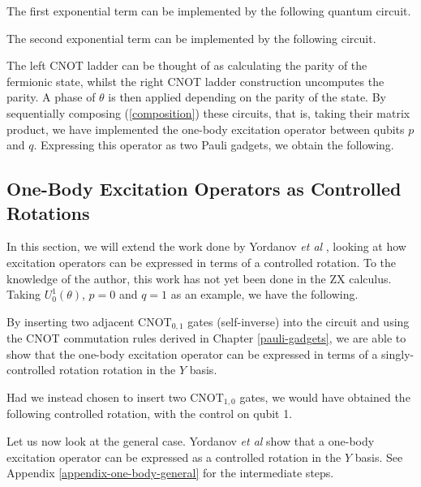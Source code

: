 The first exponential term can be implemented by the following quantum circuit.


The second exponential term can be implemented by the following circuit.


The left CNOT ladder can be thought of as calculating the parity of the fermionic state, whilst the right CNOT ladder construction uncomputes the parity. A phase of $\theta$ is then applied depending on the parity of the state. By sequentially composing (\ref{composition}) these circuits, that is, taking their matrix product, we have implemented the one-body excitation operator between qubits $p$ and $q$. Expressing this operator as two Pauli gadgets, we obtain the following.


\subsection{One-Body Excitation Operators as Controlled Rotations}

In this section, we will extend the work done by Yordanov \textit{et al} \cite{Yordanov2020}, looking at how excitation operators can be expressed in terms of a controlled rotation. To the knowledge of the author, this work has not yet been done in the ZX calculus. Taking $U^1_0(\theta)$, $p = 0$ and $q = 1$ as an example, we have the following.


By inserting two adjacent $\text{CNOT}_{0, 1}$ gates (self-inverse) into the circuit and using the CNOT commutation rules derived in Chapter \ref{pauli-gadgets}, we are able to show that the one-body excitation operator can be expressed in terms of a singly-controlled rotation rotation in the $Y$ basis.


Had we instead chosen to insert two $\text{CNOT}_{1, 0}$ gates, we would have obtained the following controlled rotation, with the control on qubit 1.


Let us now look at the general case. Yordanov \textit{et al} \cite{Yordanov2020} show that a one-body excitation operator can be expressed as a controlled rotation in the $Y$ basis. See Appendix \ref{appendix-one-body-general} for the intermediate steps.


